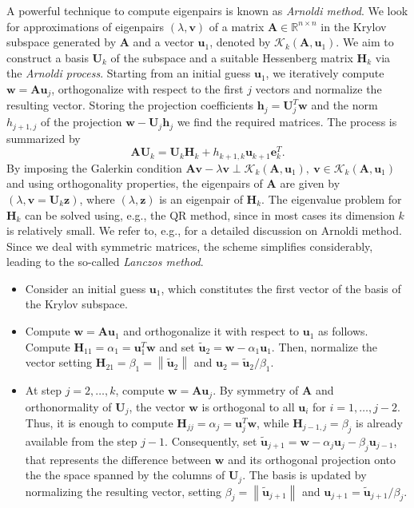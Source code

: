 \documentclass[10pt,titlepage]{article}
\numberwithin{equation}{section}
\numberwithin{figure}{section}
\newcommand{\norm}[1]{\left\lVert#1\right\rVert}
\begin{document}
A powerful technique to compute eigenpairs is known as \textit{Arnoldi method}. We look for approximations of eigenpairs $(\lambda,\mathbf{v})$ of a matrix $\mathbf{A} \in \mathbb{R}^{n \times n}$ in the Krylov subspace generated by $\mathbf{A}$ and a vector $\mathbf{u}_1$, denoted by $\mathcal{K}_k(\mathbf{A},\mathbf{u}_1)$. We aim to construct a basis $\mathbf{U}_k$ of the subspace and a suitable Hessenberg matrix $\mathbf{H}_k$ via the \textit{Arnoldi process}. Starting from an initial guess $\mathbf{u}_1$, we iteratively compute $\mathbf{w}=\mathbf{A}\mathbf{u}_j$, orthogonalize with respect to the first $j$ vectors and normalize the resulting vector. Storing the projection coefficients $\mathbf{h}_j=\mathbf{U}_j^T \mathbf{w}$ and the norm $h_{j+1,j}$ of the projection $\mathbf{w}-\mathbf{U}_j \mathbf{h}_j$ we find the required matrices. The process is summarized by
\begin{equation}
	\mathbf{A} \mathbf{U}_k=\mathbf{U}_k \mathbf{H}_k + h_{k+1,k} \mathbf{u}_{k+1} \mathbf{e}_k^T.
\end{equation} 
By imposing the Galerkin condition $\mathbf{A}\mathbf{v}-\lambda\mathbf{v} \perp \mathcal{K}_k(\mathbf{A},\mathbf{u}_1), \ \mathbf{v} \in \mathcal{K}_k(\mathbf{A},\mathbf{u}_1)$ and using orthogonality properties, the eigenpairs of $\mathbf{A}$ are given by $(\lambda,\mathbf{v}=\mathbf{U}_k \mathbf{z})$, where $(\lambda,\mathbf{z})$ is an eigenpair of $\mathbf{H}_k$. The eigenvalue problem for $\mathbf{H}_k$ can be solved using, e.g., the QR method, since in most cases its dimension $k$ is relatively small. We refer to, e.g., \cite{Quarteroni,Massei} for a detailed discussion on Arnoldi method. Since we deal with symmetric matrices, the scheme simplifies considerably, leading to the so-called \textit{Lanczos method}. 
\begin{itemize}
	\item Consider an initial guess $\mathbf{u}_1$, which constitutes the first vector of the basis of the Krylov subspace.
	\item Compute $\mathbf{w}=\mathbf{A}\mathbf{u}_1$ and orthogonalize it with respect to $\mathbf{u}_1$ as follows. Compute $\mathbf{H}_{11}=\alpha_1=\mathbf{u}_1^T\mathbf{w}$ and set $\tilde{\mathbf{u}}_2=\mathbf{w}-\alpha_1\mathbf{u}_1$. Then, normalize the vector setting $\mathbf{H}_{21}=\beta_1=\norm{\tilde{\mathbf{u}}_2}$ and $\mathbf{u}_2=\tilde{\mathbf{u}}_2/\beta_1$.
	\item At step $j=2,\dots,k$, compute $\mathbf{w}=\mathbf{A}\mathbf{u}_j$. By symmetry of $\mathbf{A}$ and orthonormality of $\mathbf{U}_j$, the vector $\mathbf{w}$ is orthogonal to all $\mathbf{u}_i$ for $i=1,\dots,j-2$. Thus, it is enough to compute $\mathbf{H}_{jj}=\alpha_j=\mathbf{u}_j^T\mathbf{w}$, while $\mathbf{H}_{j-1,j}=\beta_j$ is already available from the step $j-1$. Consequently, set $\tilde{\mathbf{u}}_{j+1}=\mathbf{w}-\alpha_j\mathbf{u}_j-\beta_j \mathbf{u}_{j-1}$, that represents the difference between $\mathbf{w}$ and its orthogonal projection onto the the space spanned by the columns of $\mathbf{U}_j$. The basis is updated by normalizing the resulting vector, setting $\beta_j=\norm{\tilde{\mathbf{u}}_{j+1}}$ and $\mathbf{u}_{j+1}=\tilde{\mathbf{u}}_{j+1}/\beta_j$.
\end{itemize}
\end{document}

